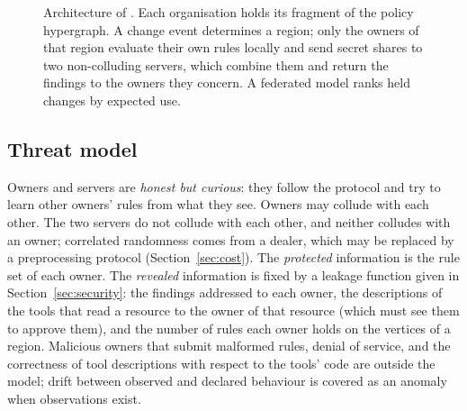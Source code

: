 \begin{figure}[t]
{}
\caption{Architecture of \name. Each organisation holds its fragment of the policy hypergraph. A change event determines a region; only the owners of that region evaluate their own rules locally and send secret shares to two non-colluding servers, which combine them and return the findings to the owners they concern. A federated model ranks held changes by expected use.}\label{fig:arch}
\end{figure}

\subsection{Threat model}\label{sec:threat}
Owners and servers are \emph{honest but curious}: they follow the protocol and try to learn other owners' rules from what they see. Owners may collude with each other. The two servers do not collude with each other, and neither colludes with an owner; correlated randomness comes from a dealer, which may be replaced by a preprocessing protocol (Section~\ref{sec:cost}). The \emph{protected} information is the rule set of each owner. The \emph{revealed} information is fixed by a leakage function given in Section~\ref{sec:security}: the findings addressed to each owner, the descriptions of the tools that read a resource to the owner of that resource (which must see them to approve them), and the number of rules each owner holds on the vertices of a region. Malicious owners that submit malformed rules, denial of service, and the correctness of tool descriptions with respect to the tools' code are outside the model; drift between observed and declared behaviour is covered as an anomaly when observations exist.


